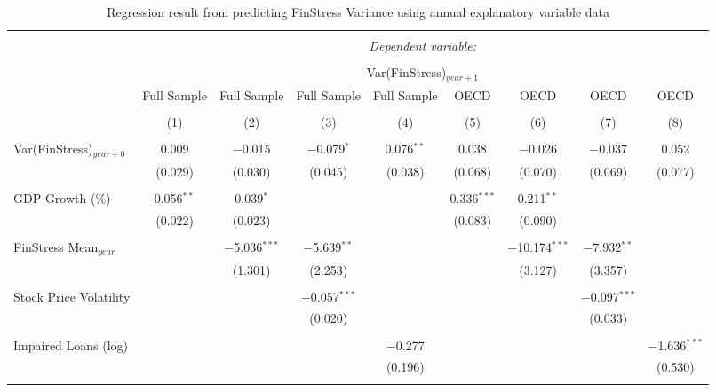 
\begin{table}[!htbp] \centering 
  \caption{Regression result from predicting FinStress Variance using annual explanatory variable data} 
  \label{annual_reg} 
\tiny 
\begin{tabular}{@{\extracolsep{5pt}}lcccccccc} 
\\[-1.8ex]\hline 
\hline \\[-1.8ex] 
 & \multicolumn{8}{c}{\textit{Dependent variable:}} \\ 
\cline{2-9} 
\\[-1.8ex] & \multicolumn{8}{c}{Var(FinStress)$_{year+1}$} \\ 
 & Full Sample & Full Sample & Full Sample & Full Sample & OECD & OECD & OECD & OECD \\ 
\\[-1.8ex] & (1) & (2) & (3) & (4) & (5) & (6) & (7) & (8)\\ 
\hline \\[-1.8ex] 
 Var(FinStress)$_{year+0}$ & 0.009 & $-$0.015 & $-$0.079$^{*}$ & 0.076$^{**}$ & 0.038 & $-$0.026 & $-$0.037 & 0.052 \\ 
  & (0.029) & (0.030) & (0.045) & (0.038) & (0.068) & (0.070) & (0.069) & (0.077) \\ 
  & & & & & & & & \\ 
 GDP Growth (\%) & 0.056$^{**}$ & 0.039$^{*}$ &  &  & 0.336$^{***}$ & 0.211$^{**}$ &  &  \\ 
  & (0.022) & (0.023) &  &  & (0.083) & (0.090) &  &  \\ 
  & & & & & & & & \\ 
 FinStress Mean$_{year}$ &  & $-$5.036$^{***}$ & $-$5.639$^{**}$ &  &  & $-$10.174$^{***}$ & $-$7.932$^{**}$ &  \\ 
  &  & (1.301) & (2.253) &  &  & (3.127) & (3.357) &  \\ 
  & & & & & & & & \\ 
 Stock Price Volatility &  &  & $-$0.057$^{***}$ &  &  &  & $-$0.097$^{***}$ &  \\ 
  &  &  & (0.020) &  &  &  & (0.033) &  \\ 
  & & & & & & & & \\ 
 Impaired Loans (log) &  &  &  & $-$0.277 &  &  &  & $-$1.636$^{***}$ \\ 
  &  &  &  & (0.196) &  &  &  & (0.530) \\ 
  & & & & & & & & \\ 

\end{tabular}
\end{table}
